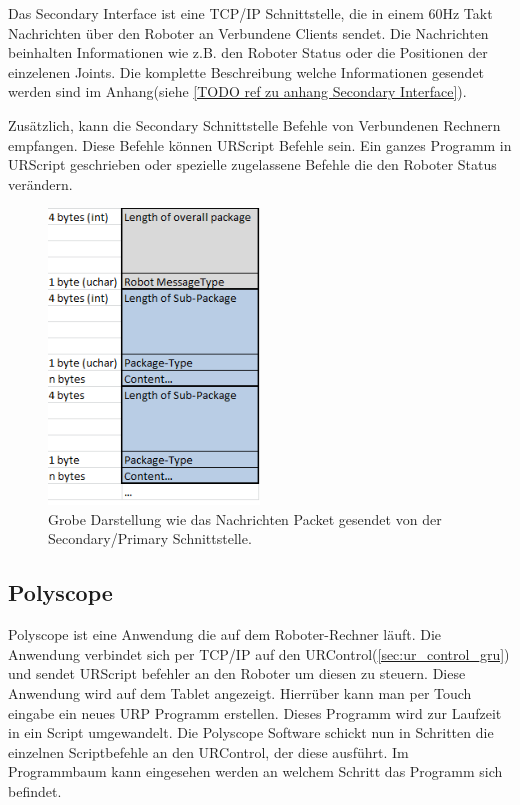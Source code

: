 Das Secondary Interface ist eine \ac{TCP/IP} Schnittstelle, die in einem 60Hz Takt Nachrichten über den Roboter an Verbundene Clients sendet.
Die Nachrichten beinhalten Informationen wie z.B. den Roboter Status oder die Positionen der einzelenen Joints.
Die komplette Beschreibung welche Informationen gesendet werden sind im Anhang(siehe \ref{TODO ref zu anhang Secondary Interface}).

Zusätzlich, kann die Secondary Schnittstelle Befehle von Verbundenen Rechnern empfangen. 
Diese Befehle können URScript Befehle sein. Ein ganzes Programm in URScript geschrieben oder spezielle zugelassene Befehle die den Roboter Status verändern.

\begin{figure}[H]
  \centering
    \includegraphics[width=0.5\textwidth]{pic/secondary_datapackage_scheme.png}
      \caption[Schema des Datenpackets gesendet von der Secondary Schnittstelle]{Grobe Darstellung wie das Nachrichten Packet gesendet von der Secondary/Primary Schnittstelle.}
      \label{fig:datascheme_of_secondary_interface}
\end{figure}

\subsection{Polyscope}
\label{urcontrol_polyscope_gru}

Polyscope ist eine Anwendung die auf dem Roboter-Rechner läuft. Die Anwendung verbindet sich per \ac{TCP/IP} auf den URControl(\ref{sec:ur_control_gru}) und sendet URScript befehler an den Roboter um diesen zu steuern.
Diese Anwendung wird auf dem Tablet angezeigt. Hierrüber kann man per Touch eingabe ein neues \ac{URP} Programm erstellen. Dieses Programm wird zur Laufzeit in ein Script umgewandelt. Die Polyscope Software schickt nun in Schritten die einzelnen Scriptbefehle an den URControl, der diese ausführt. Im Programmbaum kann eingesehen werden an welchem Schritt das Programm sich befindet.

